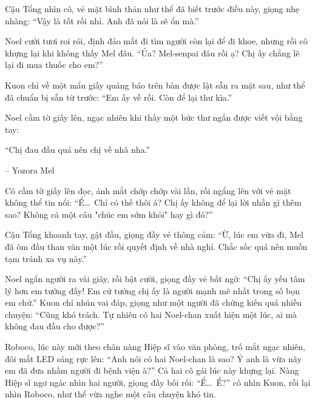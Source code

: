 \documentclass[../main.tex]{subfiles}
\begin{document}
Cậu Tổng nhìn cô, vẻ mặt bình thản như thể đã biết trước điều này, giọng nhẹ nhàng: ``Vậy là tốt rồi nhỉ. Anh đã nói là sẽ ổn mà.''

Noel cười tươi roi rói, định đảo mắt đi tìm người còn lại để đi khoe, nhưng rồi cô khựng lại khi không thấy Mel đâu. ``Ủa? Mel-senpai đâu rồi ạ? Chị ấy chẳng lẽ lại đi mua thuốc cho em?''

Kuon chỉ về một mẩu giấy quảng báo trên bàn được lật sẵn ra mặt sau, như thể đã chuẩn bị sẵn từ trước: ``Em ấy về rồi. Còn để lại thư kìa.''


Noel cầm tờ giấy lên, ngạc nhiên khi thấy một bức thư ngắn được viết vội bằng tay:

\begin{tcolorbox}[
    colframe=vol,  %
    colback=white,   %
    boxrule=0.5pt,   %
    arc=0mm,         %
    left=5pt,        %
    right=5pt,       %
    top=5pt,         %
    bottom=5pt       %
  ]
  ``Chị đau đầu quá nên chị về nhà nha.''

  \hfill -- Yozora Mel
\end{tcolorbox}

Cô cầm tờ giấy lên đọc, ánh mắt chớp chớp vài lần, rồi ngẩng lên với vẻ mặt không thể tin nổi: ``Ể\dots\ Chỉ có thế thôi á? Chị ấy không để lại lời nhắn gì thêm sao? Không cả một câu "chúc em sớm khỏi" hay gì đó?''

Cậu Tổng khoanh tay, gật đầu, giọng đầy vẻ thông cảm: ``Ừ, lúc em vừa đi, Mel đã ôm đầu than vãn một lúc rồi quyết định về nhà nghỉ. Chắc sốc quá nên muốn tạm tránh xa vụ này.''

Noel ngẩn người ra vài giây, rồi bật cười, giọng đầy vẻ bất ngờ: ``Chị ấy yếu tâm lý hơn em tưởng đấy! Em cứ tưởng chị ấy là người mạnh mẽ nhất trong số bọn em chứ.'' Kuon chỉ nhún vai đáp, giọng như một người đã chứng kiến quá nhiều chuyện: ``Cũng khó trách. Tự nhiên có hai Noel-chan xuất hiện một lúc, ai mà không đau đầu cho được?''

Roboco, lúc này mới theo chân nàng Hiệp sĩ vào văn phòng, trố mắt ngạc nhiên, đôi mắt LED sáng rực lên: ``Anh nói có hai Noel-chan là sao? Ý anh là vừa nãy em đã đưa nhầm người đi bệnh viện à?'' Cả hai cô gái lúc này khựng lại. Nàng Hiệp sĩ ngơ ngác nhìn hai người, giọng đầy bối rối: ``Ể\dots\ Ể?'' cô nhìn Kuon, rồi lại nhìn Roboco, như thể vừa nghe một câu chuyện khó tin.
\end{document}
